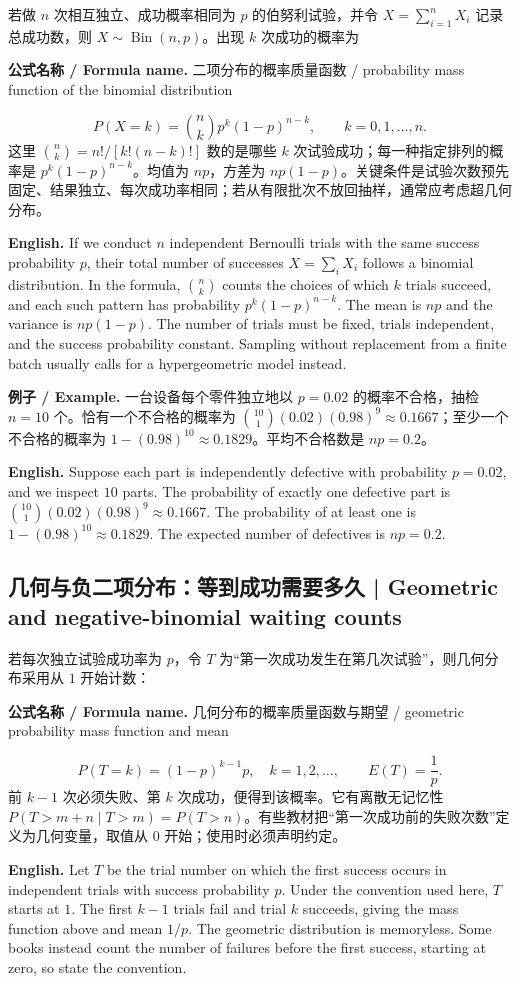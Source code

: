 \documentclass[UTF8,11pt,a4paper]{ctexart}
\newcommand{\EN}[1]{\par\noindent\textbf{English.} #1\par}
\newcommand{\FORMULA}[2]{\par\noindent\textbf{公式名称 / Formula name.} #1 / #2\par}
\newcommand{\EX}[2]{\par\noindent\textbf{例子 / Example.} #1\par\EN{#2}}
\begin{document}
若做 $n$ 次相互独立、成功概率相同为 $p$ 的伯努利试验，并令 $X=\sum_{i=1}^nX_i$ 记录总成功数，则 $X\sim\operatorname{Bin}(n,p)$。出现 $k$ 次成功的概率为
\FORMULA{二项分布的概率质量函数}{probability mass function of the binomial distribution}
\[
P(X=k)=\binom nkp^k(1-p)^{n-k},\qquad k=0,1,\ldots,n.
\]
这里 $\binom nk=n!/[k!(n-k)!]$ 数的是哪些 $k$ 次试验成功；每一种指定排列的概率是 $p^k(1-p)^{n-k}$。均值为 $np$，方差为 $np(1-p)$。关键条件是试验次数预先固定、结果独立、每次成功率相同；若从有限批次不放回抽样，通常应考虑超几何分布。
\EN{If we conduct $n$ independent Bernoulli trials with the same success probability $p$, their total number of successes $X=\sum_iX_i$ follows a binomial distribution. In the formula, $\binom nk$ counts the choices of which $k$ trials succeed, and each such pattern has probability $p^k(1-p)^{n-k}$. The mean is $np$ and the variance is $np(1-p)$. The number of trials must be fixed, trials independent, and the success probability constant. Sampling without replacement from a finite batch usually calls for a hypergeometric model instead.}

\EX{一台设备每个零件独立地以 $p=0.02$ 的概率不合格，抽检 $n=10$ 个。恰有一个不合格的概率为 $\binom{10}{1}(0.02)(0.98)^9\approx0.1667$；至少一个不合格的概率为 $1-(0.98)^{10}\approx0.1829$。平均不合格数是 $np=0.2$。}{Suppose each part is independently defective with probability $p=0.02$, and we inspect $10$ parts. The probability of exactly one defective part is $\binom{10}{1}(0.02)(0.98)^9\approx0.1667$. The probability of at least one is $1-(0.98)^{10}\approx0.1829$. The expected number of defectives is $np=0.2$.}

\subsection{几何与负二项分布：等到成功需要多久 | Geometric and negative-binomial waiting counts}
若每次独立试验成功率为 $p$，令 $T$ 为“第一次成功发生在第几次试验”，则几何分布采用从 $1$ 开始计数：
\FORMULA{几何分布的概率质量函数与期望}{geometric probability mass function and mean}
\[
P(T=k)=(1-p)^{k-1}p,\quad k=1,2,\ldots,\qquad E(T)=\frac1p.
\]
前 $k-1$ 次必须失败、第 $k$ 次成功，便得到该概率。它有离散无记忆性 $P(T>m+n\mid T>m)=P(T>n)$。有些教材把“第一次成功前的失败次数”定义为几何变量，取值从 $0$ 开始；使用时必须声明约定。
\EN{Let $T$ be the trial number on which the first success occurs in independent trials with success probability $p$. Under the convention used here, $T$ starts at $1$. The first $k-1$ trials fail and trial $k$ succeeds, giving the mass function above and mean $1/p$. The geometric distribution is memoryless. Some books instead count the number of failures before the first success, starting at zero, so state the convention.}
\end{document}
